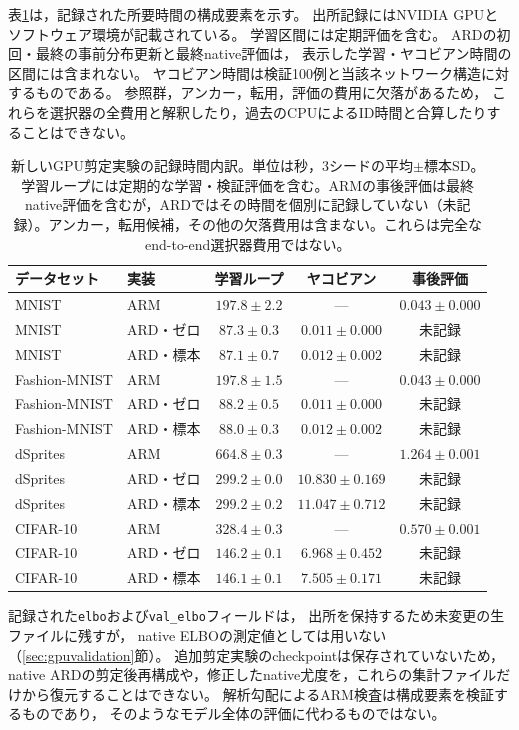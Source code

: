 \documentclass[11pt,a4paper]{ltjsarticle}
\begin{document}
表\ref{tab:newcost}は，記録された所要時間の構成要素を示す。
出所記録にはNVIDIA GPUとソフトウェア環境が記載されている。
学習区間には定期評価を含む。
ARDの初回・最終の事前分布更新と最終native評価は，
表示した学習・ヤコビアン時間の区間には含まれない。
ヤコビアン時間は検証100例と当該ネットワーク構造に対するものである。
参照群，アンカー，転用，評価の費用に欠落があるため，
これらを選択器の全費用と解釈したり，過去のCPUによるID時間と合算したりすることはできない。
\begin{table}[H]
\caption{新しいGPU剪定実験の記録時間内訳。単位は秒，3シードの平均$\pm$標本SD。学習ループには定期的な学習・検証評価を含む。ARMの事後評価は最終native評価を含むが，ARDではその時間を個別に記録していない（未記録）。アンカー，転用候補，その他の欠落費用は含まない。これらは完全なend-to-end選択器費用ではない。}\label{tab:newcost}
\small
\setlength{\tabcolsep}{3pt}
\begin{tabular*}{\textwidth}{@{\extracolsep{\fill}}llccc@{}}
\toprule
データセット & 実装 & 学習ループ & ヤコビアン & 事後評価 \\
\midrule
MNIST & ARM & $197.8 \pm 2.2$ & --- & $0.043 \pm 0.000$ \\
MNIST & ARD・ゼロ & $87.3 \pm 0.3$ & $0.011 \pm 0.000$ & 未記録 \\
MNIST & ARD・標本 & $87.1 \pm 0.7$ & $0.012 \pm 0.002$ & 未記録 \\
Fashion-MNIST & ARM & $197.8 \pm 1.5$ & --- & $0.043 \pm 0.000$ \\
Fashion-MNIST & ARD・ゼロ & $88.2 \pm 0.5$ & $0.011 \pm 0.000$ & 未記録 \\
Fashion-MNIST & ARD・標本 & $88.0 \pm 0.3$ & $0.012 \pm 0.002$ & 未記録 \\
dSprites & ARM & $664.8 \pm 0.3$ & --- & $1.264 \pm 0.001$ \\
dSprites & ARD・ゼロ & $299.2 \pm 0.0$ & $10.830 \pm 0.169$ & 未記録 \\
dSprites & ARD・標本 & $299.2 \pm 0.2$ & $11.047 \pm 0.712$ & 未記録 \\
CIFAR-10 & ARM & $328.4 \pm 0.3$ & --- & $0.570 \pm 0.001$ \\
CIFAR-10 & ARD・ゼロ & $146.2 \pm 0.1$ & $6.968 \pm 0.452$ & 未記録 \\
CIFAR-10 & ARD・標本 & $146.1 \pm 0.1$ & $7.505 \pm 0.171$ & 未記録 \\
\bottomrule\end{tabular*}
\end{table}

記録された\texttt{elbo}および\texttt{val\_elbo}フィールドは，
出所を保持するため未変更の生ファイルに残すが，
native ELBOの測定値としては用いない（\ref{sec:gpuvalidation}節）。
追加剪定実験のcheckpointは保存されていないため，
native ARDの剪定後再構成や，修正したnative尤度を，これらの集計ファイルだけから復元することはできない。
解析勾配によるARM検査は構成要素を検証するものであり，
そのようなモデル全体の評価に代わるものではない。
\end{document}
